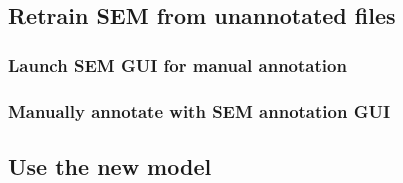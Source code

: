 \documentclass[12pt]{article}
\begin{document}
        \subsection{Retrain SEM from unannotated files}
        \label{sec:retrain-sem-unannotated}
        
        
            \subsubsection{Launch SEM GUI for manual annotation}
            \label{subsubsec:launch-sem-annotation-gui}
            
        
            \subsubsection{Manually annotate with SEM annotation GUI}
            \label{subsubsec:manually-annotate-with-sem}
            
        
        \subsection{Use the new model}
        \label{subsec:use-new-model}
        
    
    \printbibliography
\end{document}
